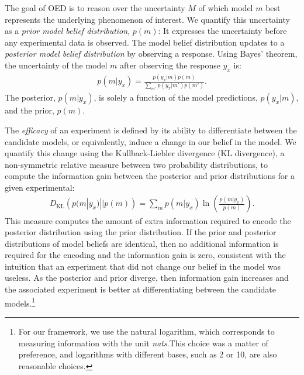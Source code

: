 \documentclass{article}
\begin{document}
The goal of OED is to reason over the uncertainty $M$ of which model $m$ best represents the underlying phenomenon of interest. We quantify this uncertainty as a \emph{prior model belief distribution}, $p(m)$: It expresses the uncertainty before any experimental data is observed. 
The model belief distribution updates to a \emph{posterior model belief distribution} by observing a response. Using Bayes' theorem, the uncertainty of the model $m$ after observing the response $y_x$ is:
\begin{align}
p(m|y_x) = \frac{p(y_x|m)p(m)}{\sum\limits_{m'} p(y_x|m')p(m')}. \label{eq:bayes}
\end{align}
The posterior, $p(m|y_x)$, is solely a function of the model predictions, $p(y_x|m)$, and the prior, $p(m)$.

The \emph{efficacy} of an experiment is defined by its ability to differentiate between the candidate models, or equivalently, induce a change in our belief in the model. We quantify this change using the Kullback-Liebler divergence (KL divergence), a non-symmetric relative measure between two probability distributions, to compute the information gain between the posterior and prior distributions for a given experimental:
\begin{align}
D_{\text{KL}}\left(p(m|y_x) || p(m)\right) = \sum\limits_m p(m|y_x) \ln \left( \frac{p(m|y_x)}{p(m)}\right). \label{eq:kl}
\end{align}
This measure computes the amount of extra information required to encode the posterior distribution using the prior distribution. If the prior and posterior distributions of model beliefs are identical, then no additional information is required for the encoding and the information gain is zero, consistent with the intuition that an experiment that did not change our belief in the model was useless. As the posterior and prior diverge, then information gain increases and the associated experiment is better at differentiating between the candidate models.\footnote{For our framework, we use the natural logarithm, which corresponds to measuring information with the unit \emph{nats}.This choice was a matter of preference, and logarithms with different bases, such as 2 or 10, are also reasonable choices.}
\end{document}
